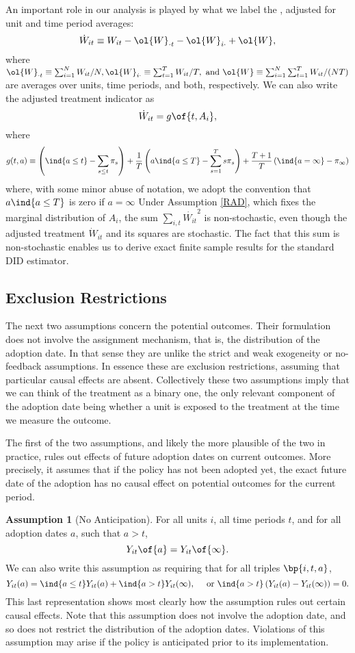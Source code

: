 \documentclass[12pt]{article}
\newcommand{\highlightB}[1]{{\emph{\color{MyBlue}{#1}}}}
\theoremstyle{definition}
\newtheorem{assumption}{Assumption}
\begin{document}
An important role in our analysis is played by what we label the \highlightB{adjusted treatment}, adjusted for unit and time period averages:
$$
\dot{W}_{i t} \equiv W_{i t}-\ol{W}_{\cdot t} - \ol{W}_{i \cdot} + \ol{W},
$$
where 
$
\ol{W}_{\cdot t} \equiv \sum_{i=1}^N W_{i t} / N, \ol{W}_{i \cdot} \equiv \sum_{t=1}^T W_{i t} / T, \text { and } \ol{W} \equiv \sum_{i=1}^N \sum_{t=1}^T W_{i t} /(N T)
$
are averages over units, time periods, and both, respectively. We can also write the adjusted treatment indicator as 
$$\dot{W}_{it} = g\of{t, A_i},$$
where 
$$
g(t, a) \equiv\left(\ind{a \leq t}-\sum_{s \leq t} \pi_s\right)+\frac{1}{T}\left(a \ind{a \leq T}-\sum_{s=1}^T s \pi_s\right)+\frac{T+1}{T}\left(\ind{a=\infty}-\pi_{\infty}\right)
$$
where, with some minor abuse of notation, we adopt the convention that $a \ind{a \leq T}$ is zero if $a = \infty$ Under Assumption \ref{RAD}, which fixes the marginal distribution of $A_i$, the sum $\sum_{i,t}\dot{W_{it}}^2$ is non-stochastic, even though the adjusted treatment $\dot{W}_{it}$ and its squares are stochastic. The fact that this sum is non-stochastic enables us to derive exact finite sample results for the standard DID estimator.

\subsection{Exclusion Restrictions}

The next two assumptions concern the potential outcomes. Their formulation does not involve the assignment mechanism, that is, the distribution of the adoption date. In that sense they are unlike the strict and weak exogeneity or no-feedback assumptions. In essence these are exclusion restrictions, assuming that particular causal effects are absent. Collectively these two assumptions imply that we can think of the treatment as a binary one, the only relevant component of the adoption date being whether a unit is exposed to the treatment at the time we measure the outcome. 

The first of the two assumptions, and likely the more plausible of the two in practice, rules out effects of future adoption dates on current outcomes. More precisely, it assumes that if the policy has not been adopted yet, the exact future date of the adoption has no causal effect on potential outcomes for the current period. 

\begin{assumption}[No Anticipation] \label{NA}
    For all units $i$, all time periods $t$, and for all adoption dates $a$, such that $a > t$,
    $$Y_{it}\of{a} = Y_{it}\of{\infty}.$$
    We can also write this assumption as requiring that for all triples $\bp{i,t,a}$, 
    $$
    Y_{i t}(a)=\ind{a \leq t} Y_{i t}(a)+\ind{a>t} Y_{i t}(\infty), \quad \text { or } \ind{a>t}\left(Y_{i t}(a)-Y_{i t}(\infty)\right)=0 .
    $$
    This last representation shows most clearly how the assumption rules out certain causal effects. Note that this assumption does not involve the adoption date, and so does not restrict the distribution of the adoption dates. Violations of this assumption may arise if the policy is anticipated prior to its implementation.
\end{assumption}
\end{document}
